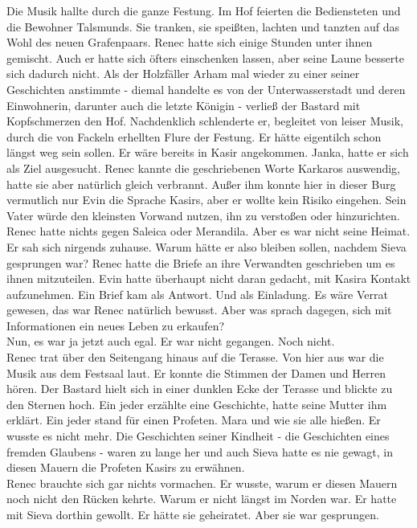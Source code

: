 Die Musik hallte durch die ganze Festung. Im Hof feierten die Bediensteten und die Bewohner 
Talsmunds. Sie tranken, sie speißten, lachten und tanzten auf das Wohl des neuen Grafenpaars. 
Renec hatte sich einige Stunden unter ihnen gemischt. Auch er hatte sich öfters einschenken 
lassen, aber seine Laune besserte sich dadurch nicht. Als der Holzfäller Arham mal wieder zu 
einer seiner Geschichten anstimmte - diemal handelte es von der Unterwasserstadt und deren 
Einwohnerin, darunter auch die letzte Königin - verließ der Bastard mit Kopfschmerzen den Hof. 
Nachdenklich schlenderte er, begleitet von leiser Musik, durch die von Fackeln erhellten Flure der 
Festung. Er hätte eigentilch schon längst weg sein sollen. Er wäre bereits in Kasir angekommen. 
Janka, hatte er sich als Ziel ausgesucht. Renec kannte die geschriebenen Worte Karkaros auswendig, 
hatte sie aber natürlich gleich verbrannt. Außer ihm konnte hier in dieser Burg vermutlich nur Evin 
die Sprache Kasirs, aber er wollte kein Risiko eingehen. Sein Vater würde den kleinsten Vorwand 
nutzen, ihn zu verstoßen oder hinzurichten. Renec hatte nichts gegen Saleica oder Merandila. Aber 
es war nicht seine Heimat. Er sah sich nirgends zuhause. Warum hätte er also bleiben sollen, 
nachdem Sieva gesprungen war? Renec hatte die Briefe an ihre Verwandten geschrieben um es ihnen 
mitzuteilen. Evin hatte überhaupt nicht daran gedacht, mit Kasira Kontakt aufzunehmen. Ein Brief 
kam als Antwort. Und als Einladung. Es wäre Verrat gewesen, das war Renec natürlich bewusst. Aber 
was sprach dagegen, sich mit Informationen ein neues Leben zu erkaufen?\\
Nun, es war ja jetzt auch egal. Er war nicht gegangen. Noch nicht.\\
Renec trat über den Seitengang hinaus auf die Terasse. Von hier aus war die Musik aus dem Festsaal 
laut. Er konnte die Stimmen der Damen und Herren hören. Der Bastard hielt sich in einer dunklen 
Ecke der Terasse und blickte zu den Sternen hoch. Ein jeder erzählte eine Geschichte, hatte seine 
Mutter ihm erklärt. Ein jeder stand für einen Profeten. Mara und wie sie alle hießen. Er wusste es 
nicht mehr. Die Geschichten seiner Kindheit - die Geschichten eines fremden Glaubens - waren zu 
lange her und auch Sieva hatte es nie gewagt, in diesen Mauern die Profeten Kasirs zu erwähnen.\\
Renec brauchte sich gar nichts vormachen. Er wusste, warum er diesen Mauern noch nicht den Rücken 
kehrte. Warum er nicht längst im Norden war. Er hatte mit Sieva dorthin gewollt. Er hätte sie 
geheiratet. Aber sie war gesprungen.\\
